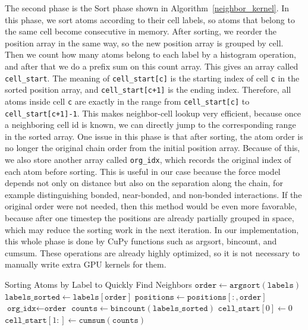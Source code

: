 \documentclass[12pt]{article}
\begin{document}
The second phase is the Sort phase shown in Algorithm~\ref{neighbor_kernel}. In this phase, we sort atoms according to their cell labels, so atoms that belong to the same cell become consecutive in memory. After sorting, we reorder the position array in the same way, so the new position array is grouped by cell. Then we count how many atoms belong to each label by a histogram operation, and after that we do a prefix sum on this count array. This gives an array called \texttt{cell\_start}. The meaning of \texttt{cell\_start[c]} is the starting index of cell \texttt{c} in the sorted position array, and \texttt{cell\_start[c+1]} is the ending index. Therefore, all atoms inside cell \texttt{c} are exactly in the range from \texttt{cell\_start[c]} to \texttt{cell\_start[c+1]-1}. This makes neighbor-cell lookup very efficient, because once a neighboring cell id is known, we can directly jump to the corresponding range in the sorted array. One issue in this phase is that after sorting, the atom order is no longer the original chain order from the initial position array. Because of this, we also store another array called \texttt{org\_idx}, which records the original index of each atom before sorting. This is useful in our case because the force model depends not only on distance but also on the separation along the chain, for example distinguishing bonded, near-bonded, and non-bonded interactions. If the original order were not needed, then this method would be even more favorable, because after one timestep the positions are already partially grouped in space, which may reduce the sorting work in the next iteration. In our implementation, this whole phase is done by CuPy functions such as argsort, bincount, and cumsum. These operations are already highly optimized, so it is not necessary to manually write extra GPU kernels for them.

\begin{algorithm}[h]
\caption{Neighbor Retrieving Array Building} \label{algo:neighbor_kernel}
\begin{algorithmic}[1]
\State Sorting Atoms by Label to Quickly Find Neighbors
\State $\texttt{order} \gets \texttt{argsort}(\texttt{labels})$
\State $\texttt{labels\_sorted} \gets \texttt{labels}[\texttt{order}]$
\State $\texttt{positions} \gets \texttt{positions}[:, \texttt{order}]$
\State $\texttt{org\_idx} \gets \texttt{order}$
\State $\texttt{counts} \gets \texttt{bincount}(\texttt{labels\_sorted})$
\State $\texttt{cell\_start}[0] \gets 0$
\State $\texttt{cell\_start}[1:] \gets \texttt{cumsum}(\texttt{counts})$

\end{algorithmic}
\end{algorithm}
\end{document}
